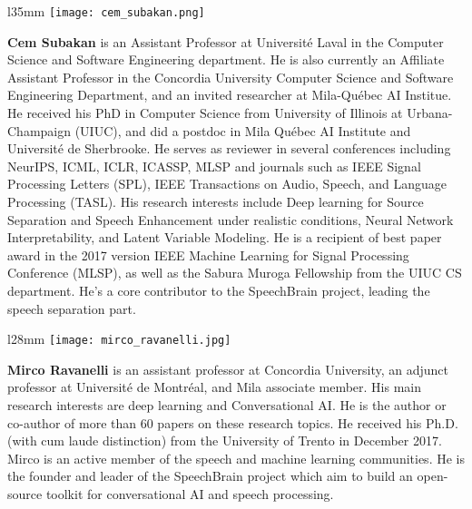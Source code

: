 \documentclass[lettersize,journal]{IEEEtran}
\begin{document}




\begin{wrapfigure}{l}{35mm} 
    \texttt{[image: cem\_subakan.png]}
\end{wrapfigure}\par

\noindent \textbf{Cem Subakan} is an Assistant Professor at Universit\'{e} Laval in the Computer Science and Software Engineering department. He is also currently an Affiliate Assistant Professor in the Concordia University Computer Science and Software Engineering Department, and an invited researcher at Mila-Québec AI Institue. He received his PhD in Computer Science from University of Illinois at Urbana-Champaign (UIUC), and did a postdoc in Mila Québec AI Institute and Université de Sherbrooke. He serves as reviewer in several conferences including NeurIPS, ICML, ICLR, ICASSP, MLSP and journals such as IEEE Signal Processing Letters (SPL), IEEE Transactions on Audio, Speech, and Language Processing (TASL). His research interests include Deep learning for Source Separation and Speech Enhancement under realistic conditions, Neural Network Interpretability, and Latent Variable Modeling. He is a recipient of best paper award in the 2017 version IEEE Machine Learning for Signal Processing Conference (MLSP), as well as the Sabura Muroga Fellowship from the UIUC CS department. He's a core contributor to the SpeechBrain project, leading the speech separation part. \\


\begin{wrapfigure}{l}{28mm} 
    \texttt{[image: mirco\_ravanelli.jpg]}
\end{wrapfigure}\par

\noindent\textbf{Mirco Ravanelli} is an assistant professor at Concordia University, an adjunct professor at Université de Montréal, and Mila associate member. His main research interests are deep learning and Conversational AI. He is the author or co-author of more than 60 papers on these research topics. He received his Ph.D. (with cum laude distinction) from the University of Trento in December 2017. Mirco is an active member of the speech and machine learning communities. He is the founder and leader of the SpeechBrain project which aim to build an open-source toolkit for conversational AI and speech processing. \\
\end{document}
